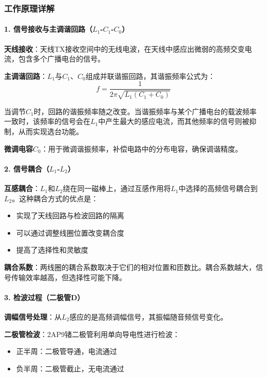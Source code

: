 \documentclass[12pt,UTF8]{ctexbook}
\begin{document}
\subsubsection{工作原理详解}

\paragraph{1. 信号接收与主调谐回路（$L_1$-$C_1$-$C_0$）}

\textbf{天线接收}：天线TX接收空间中的无线电波，在天线中感应出微弱的高频交变电流，包含多个广播电台的信号。

\textbf{主调谐回路}：$L_1$与$C_1$、$C_0$组成并联谐振回路，其谐振频率公式为：
\[ f = \frac{1}{2\pi\sqrt{L_1(C_1+C_0)}} \]

当调节$C_1$时，回路的谐振频率随之改变。当谐振频率与某个广播电台的载波频率一致时，该频率的信号会在$L_1$中产生最大的感应电流，而其他频率的信号则被抑制，从而实现选台功能。

\textbf{微调电容$C_0$}：用于微调谐振频率，补偿电路中的分布电容，确保调谐精度。

\paragraph{2. 信号耦合（$L_1$-$L_2$）}

\textbf{互感耦合}：$L_1$和$L_2$绕在同一磁棒上，通过互感作用将$L_1$中选择的高频信号耦合到$L_2$。这种耦合方式的优点是：
\begin{itemize}
  \item 实现了天线回路与检波回路的隔离
  \item 可以通过调整线圈位置改变耦合度
  \item 提高了选择性和灵敏度
\end{itemize}

\textbf{耦合系数}：两线圈的耦合系数取决于它们的相对位置和匝数比。耦合系数越大，信号传输效率越高，但选择性可能下降。

\paragraph{3. 检波过程（二极管D）}

\textbf{调幅信号处理}：从$L_2$感应的是高频调幅信号，其振幅随音频信号变化。

\textbf{二极管检波}：2AP9锗二极管利用单向导电性进行检波：\begin{itemize}
  \item 正半周：二极管导通，电流通过
  \item 负半周：二极管截止，无电流通过\end{itemize}
\end{document}
